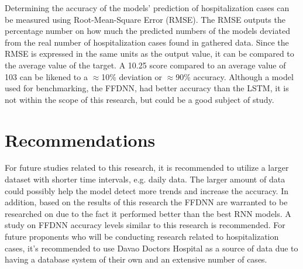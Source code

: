 \documentclass[10pt,11pt,12pt,oneside]{book}
\begin{document}
Determining the accuracy of the models' prediction of hospitalization cases can be measured using Root-Mean-Square Error (RMSE). The RMSE outputs the percentage number on how much the predicted numbers of the models deviated from the real number of hospitalization cases found in gathered data. Since the RMSE is expressed in the same units as the output value, it can be compared to the average value of the target. A 10.25 score compared to an average value of 103 can be likened to a $\approx$10\% deviation or $\approx$90\% accuracy. Although a model used for benchmarking, the FFDNN, had better accuracy than the LSTM, it is not within the scope of this research, but could be a good subject of study.


\section{Recommendations}
For future studies related to this research, it is recommended to utilize a larger dataset with shorter time intervals, e.g. daily data. The larger amount of data could possibly help the model detect more trends and increase the accuracy. 
In addition, based on the results of this research the FFDNN are warranted to be researched on due to the fact it performed better than the best RNN models. A study on FFDNN accuracy levels similar to this research is recommended.
For future proponents who will be conducting research related to hospitalization cases, it's recommended to use Davao Doctors Hospital as a source of data due to having a database system of their own and an extensive number of cases.
    
    
\end{document}
